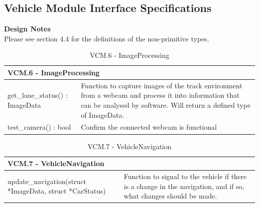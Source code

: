 \documentclass [10pt]{article}
\begin{document}
\subsection{Vehicle Module Interface Specifications}
\textbf{Design Notes} \\
Please see section 4.4 for the definitions of the non-primitive types.
\begin{longtable}{| p{ } | p{ } | }\caption{VCM.6 - ImageProcessing} \\\hline  
 \multicolumn{2}{|l|}{\textbf {VCM.6 - ImageProcessing}}\\ \hline
\cellcolor{tableCell}get\_lane\_status() : ImageData & \cellcolor{tableCell}Function to capture images of the track environment from a webcam and process it into information that can be analysed by software. Will return a defined type of ImageData.  \\ \hline 

test\_camera() : bool & Confirm the connected webcam is functional \\ \hline


\end{longtable}

\begin{longtable}{| p{ } | p{ } | }\caption{VCM.7 - VehicleNavigation} \\\hline  
 \multicolumn{2}{|l|}{\textbf {VCM.7 - VehicleNavigation}}\\ \hline
\cellcolor{tableCell}update\_navigation(struct *ImageData,  struct *CarStatus) & \cellcolor{tableCell}Function to signal to the vehicle if there is a change in the navigation, and if so, what changes should be made. \\ \hline 



\end{longtable}
\end{document}
